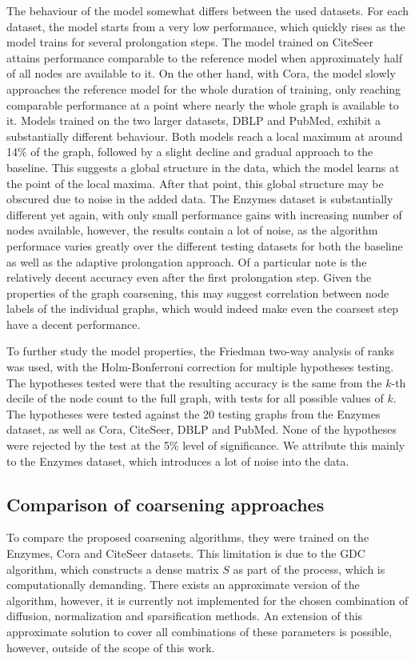 The behaviour of the model somewhat differs between the used datasets. For each dataset, the model starts from a very low performance, which quickly rises as the model trains for several prolongation steps. The model trained on CiteSeer attains performance comparable to the reference model when approximately half of all nodes are available to it. On the other hand, with Cora, the model slowly approaches the reference model for the whole duration of training, only reaching comparable performance at a point where nearly the whole graph is available to it. Models trained on the two larger datasets, DBLP and PubMed, exhibit a substantially different behaviour. Both models reach a local maximum at around 14\% of the graph, followed by a slight decline and gradual approach to the baseline. This suggests a global structure in the data, which the model learns at the point of the local maxima. After that point, this global structure may be obscured due to noise in the added data. The Enzymes dataset is substantially different yet again, with only small performance gains with increasing number of nodes available, however, the results contain a lot of noise, as the algorithm performace varies greatly over the different testing datasets for both the baseline as well as the adaptive prolongation approach. Of a particular note is the relatively decent accuracy even after the first prolongation step. Given the properties of the graph coarsening, this may suggest correlation between node labels of the individual graphs, which would indeed make even the coarsest step have a decent performance.

To further study the model properties, the Friedman two-way analysis of ranks was used, with the Holm-Bonferroni correction for multiple hypotheses testing. The hypotheses tested were that the resulting accuracy is the same from the \( k \)-th decile of the node count to the full graph, with tests for all possible values of \( k \). The hypotheses were tested against the 20 testing graphs from the Enzymes dataset, as well as Cora, CiteSeer, DBLP and PubMed. None of the hypotheses were rejected by the test at the 5\% level of significance. We attribute this mainly to the Enzymes dataset, which introduces a lot of noise into the data.

\subsection{Comparison of coarsening approaches}

To compare the proposed coarsening algorithms, they were trained on the Enzymes, Cora and CiteSeer datasets. This limitation is due to the GDC algorithm, which constructs a dense matrix \( S \) as part of the process, which is computationally demanding. There exists an approximate version of the algorithm, however, it is currently not implemented for the chosen combination of diffusion, normalization and sparsification methods. An extension of this approximate solution to cover all combinations of these parameters is possible, however, outside of the scope of this work.


